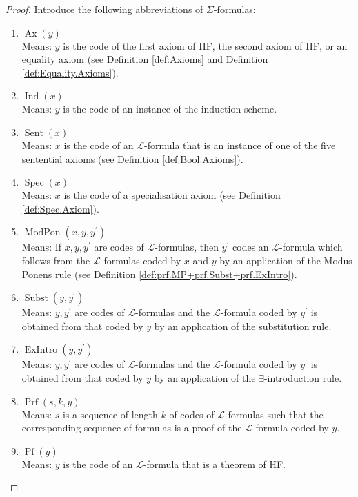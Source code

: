 \begin{proof}
    Introduce the following abbreviations of $\Sigma$-formulas:
    \begin{enumerate}
        \item $\operatorname{Ax}(y)$\\
        Means: $y$ is the code of the first axiom of HF, the second axiom of HF, or 
        an equality axiom 
        (see Definition \ref{def:Axioms} and Definition \ref{def:Equality.Axioms}).
        \item $\operatorname{Ind}(x)$\\
        Means: $y$ is the code of an instance of the induction scheme.
        \item $\operatorname{Sent}(x)$\\
        Means: $x$ is the code of an $\mathcal{L}$-formula that is an instance 
        of one of the five sentential axioms (see Definition \ref{def:Bool.Axioms}).
        \item $\operatorname{Spec}(x)$\\
        Means: $x$ is the code of a specialisation axiom (see Definition \ref{def:Spec.Axiom}).
        \item $\operatorname{ModPon}(x,y,y^\prime)$\\
        Means: If $x,y,y^\prime$ are codes of $\mathcal{L}$-formulas, 
        then $y^\prime$ codes an $\mathcal{L}$-formula which follows from the $\mathcal{L}$-formulas
        coded by $x$ and $y$ by an application of the Modus Ponens rule 
        (see Definition \ref{def:prf.MP+prf.Subst+prf.ExIntro}).
        \item $\operatorname{Subst}(y,y^\prime)$\\
        Means: $y,y^\prime$ are codes of $\mathcal{L}$-formulas and
        the $\mathcal{L}$-formula coded by $y^\prime$ is obtained from that coded by $y$ by
        an application of the substitution rule.
        \item $\operatorname{ExIntro}(y, y^\prime)$\\
        Means: $y,y^\prime$ are codes of $\mathcal{L}$-formulas and
        the $\mathcal{L}$-formula coded by $y^\prime$ is obtained from that coded by $y$ by
        an application of the $\exists$-introduction rule.
        \item $\operatorname{Prf}(s, k, y)$\\
        Means: $s$ is a sequence of length $k$ of codes of $\mathcal{L}$-formulas 
        such that the corresponding sequence of formulas is a proof of the 
        $\mathcal{L}$-formula coded by $y$.
        \item $\operatorname{Pf}(y)$\\
        Means: $y$ is the code of an $\mathcal{L}$-formula that is a theorem of HF.
    \end{enumerate}
\end{proof}

